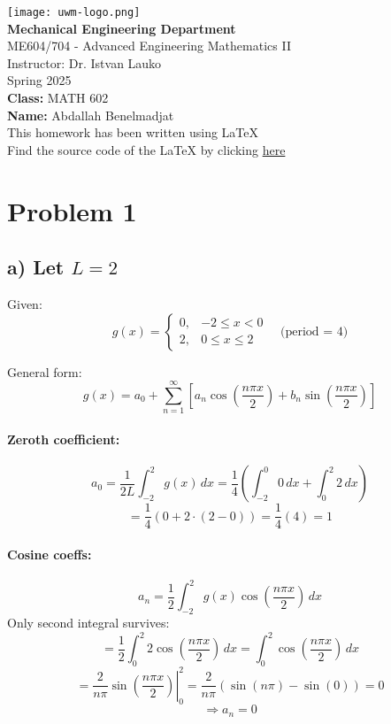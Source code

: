 \documentclass{article}
\date{}
\begin{document}
\begin{titlepage}
    \centering
    \texttt{[image: uwm-logo.png]} \\
    \vspace{1cm}
    {\large \textbf{Mechanical Engineering Department}}\\[0.5em]
    {\large ME604/704 - Advanced Engineering Mathematics II}\\[0.5em]
    {\large Instructor: Dr. Istvan Lauko}\\[0.5em]
    {\large Spring 2025}\\[2cm]
    
    {\large \textbf{Class:} MATH 602}\\[0.5em]
    {\large \textbf{Name:} Abdallah Benelmadjat}\\[0.5em]
    {\large This homework has been written using \LaTeX}\\
    {\large Find the source code of the LaTeX by clicking \href{https://github.com/your-repo}{here}}\\

\end{titlepage}

\newpage

\section*{Problem 1}
\subsection*{a) Let $L = 2$}

Given:
\[
g(x) =
\begin{cases}
0, & -2 \le x < 0 \\
2, & 0 \le x \le 2
\end{cases}
\quad \text{(period = 4)}
\]

General form:
\[
g(x) = a_0 + \sum_{n=1}^\infty \left[ a_n \cos\left( \frac{n\pi x}{2} \right) + b_n \sin\left( \frac{n\pi x}{2} \right) \right]
\]

\paragraph{Zeroth coefficient:}
\[
a_0 = \frac{1}{2L} \int_{-2}^{2} g(x)\,dx = \frac{1}{4} \left( \int_{-2}^{0} 0\,dx + \int_0^2 2\,dx \right)
\]
\[
= \frac{1}{4} (0 + 2 \cdot (2 - 0)) = \frac{1}{4}(4) = 1
\]

\paragraph{Cosine coeffs:}
\[
a_n = \frac{1}{2} \int_{-2}^{2} g(x) \cos\left( \frac{n\pi x}{2} \right)\,dx
\]
Only second integral survives:
\[
= \frac{1}{2} \int_0^2 2 \cos\left( \frac{n\pi x}{2} \right)\,dx = \int_0^2 \cos\left( \frac{n\pi x}{2} \right)\,dx
\]
\[
= \left. \frac{2}{n\pi} \sin\left( \frac{n\pi x}{2} \right) \right|_0^2 = \frac{2}{n\pi} ( \sin(n\pi) - \sin(0) ) = 0
\]
\[
\Rightarrow a_n = 0
\]
\end{document}
